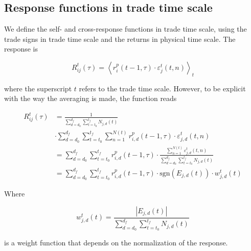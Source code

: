 \subsection{Response functions in trade time scale}
\label{subsec:response_function_trade}

We define the self- and cross-response functions in trade time scale, using the
trade signs in trade time scale and the returns in physical time scale. The
response is

\begin{equation}\label{eq:response_functions_trade_scale_general}
    R^{t}_{ij}\left(\tau\right)=\left\langle r^{p}_{i}\left(t-1,\tau
    \right)\cdot\varepsilon_{j}^{t} \left(t, n\right)\right\rangle _{t}
\end{equation}

where the superscript $t$ refers to the trade time scale. However, to be
explicit with the way the averaging is made, the function reads

\begin{align}\label{eq:response_trades_explicit}
    R_{ij}^{t}\left(\tau\right)&=\frac{1}{\sum_{d=d_{0}}^{d_{f}}
    \sum_{t=t_{0}}^{t_{f}}N_{j,d} \left(t \right)} \nonumber \\
    &\cdot\sum_{d=d_{0}}^{d_{f}}\sum_{t=t_{0}}^{t_{f}}\sum_{n=1}
    ^{N\left(t\right)} r^{p}_{i,d}\left(t-1, \tau\right)\cdot
    \varepsilon_{j,d}^{t}\left(t,n\right)\\
    &=\sum_{d=d_{0}}^{d_{f}}\sum_{t=t_{0}}^{t_{f}} r^{p}_{i,d}
    \left(t-1,\tau\right) \cdot\frac{\sum_{n=1}^{N\left(t\right)}
    \varepsilon_{j,d}^{t}\left(t,n \right)} {\sum_{d=d_{0}}^{d_{f}}
    \sum_{t=t_{0}}^{t_{f}}N_{j,d}\left(t\right)} \nonumber \\
    &=\sum_{d=d_{0}}^{d_{f}}\sum_{t=t_{0}}^{t_{f}}r^{p}_{i,d}
    \left(t-1,\tau\right) \cdot \text{sgn}\left(E_{j,d}\left(t\right)\right)
    \cdot w_{j,d}^{t}\left(t\right)
\end{align}

Where

\begin{equation}\label{eq:trade_weight}
    w_{j,d}^{t}\left(t\right) = \frac{\left|E_{j,d}\left(t\right)\right|}
    {\sum_{d=d_{0}}^{d_{f}}\sum_{t=t_{0}}^{t_{f}}N_{j,d} \left(t\right)}
\end{equation}

is a weight function that depends on the normalization of the response.

